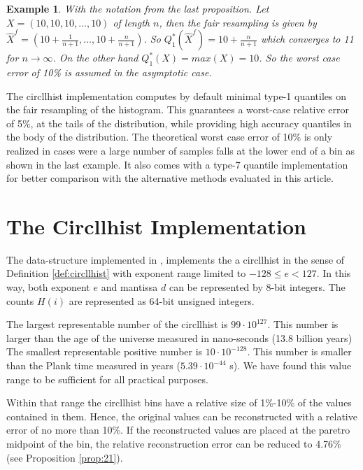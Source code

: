 \documentclass{article}
\theoremstyle{plain}
\newtheorem{example}[definition]{Example}
\theoremstyle{remark}
\newcommand{\ra}{\rightarrow}
\begin{document}
\begin{example}
  With the notation from the last proposition.  Let $X=(10,10,10, \dots, 10)$ of length $n$, then
  the fair resampling is given by $\hat{X}^f = (10 + \frac{1}{n+1}, \dots, 10 + \frac{n}{n+1})$.
  So $Q^*_1(\hat{X}^f) = 10 + \frac{n}{n+1}$ which converges to 11 for $n \ra \infty$.
  On the other hand $Q^*_1(X) = max(X) = 10$. So the worst case error of 10\% is assumed
  in the asymptotic case.
\end{example}

The circllhist implementation computes by default minimal type-1 quantiles on the fair resampling of
the histogram.  This guarantees a worst-case relative error of 5\%, at the tails of the
distribution, while providing high accuracy quantiles in the body of the distribution.  The
theoretical worst case error of 10\% is only realized in cases were a large number of samples falls
at the lower end of a bin as shown in the last example.
It also comes with a type-7 quantile implementation for better comparison with the alternative
methods evaluated in this article.

\section{The Circllhist Implementation}

The data-structure implemented in \cite{libcircllhist}, implements the a circllhist in the sense of
Definition \ref{def:circllhist} with exponent range limited to $-128 \leq e < 127$.
In this way, both exponent $e$ and mantissa $d$ can be represented by 8-bit integers.
The counts $H(i)$ are represented as 64-bit unsigned integers.

The largest representable number of the circllhist is $99 \cdot 10^{127}$.
This number is larger than the age of the universe measured in nano-seconds (13.8 billion years)
The smallest representable positive number is $10 \cdot 10^{-128}$.
This number is smaller than the Plank time measured in years ($5.39 \cdot 10^{-44}$ s).
We have found this value range to be sufficient for all practical purposes.

Within that range the circllhist bins have a relative size of 1\%-10\% of the values contained in
them. Hence, the original values can be reconstructed with a relative error of no more than 10\%.
If the reconstructed values are placed at the paretro midpoint of the bin, the relative reconstruction
error can be reduced to 4.76\% (see Proposition \ref{prop:21}).
\end{document}
